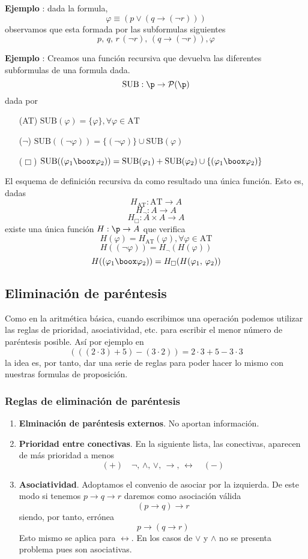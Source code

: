 \addtocounter{ej}{1} %
\textbf{Ejemplo }: dada la formula, 
\[ \varphi \equiv (p \lor (q \rightarrow (\neg r))) \]
observamos que esta formada por las subformulas siguientes
\[ p, \, q, \, r \, (\neg r), \, (q \rightarrow (\neg r)), \varphi \]
\addtocounter{ej}{1} %
\textbf{Ejemplo }: Creamos una función recursiva que devuelva las diferentes subformulas de una formula dada.
\[ \mbox{SUB}: \p \rightarrow \mathcal{P}(\p) \]
dada por 
\begin{itemize}
	\item[(AT)] $\mbox{SUB}(\varphi)=\{\varphi \}, \forall \varphi \in \mbox{AT}$
	\item[($\neg$)] $\mbox{SUB}((\neg \varphi))=\{ (\neg\varphi)\} \cup \mbox{SUB}(\varphi)$
	\item[($\Box$)] $ \mbox{SUB} ((\varphi_1 \boox \varphi_2) )= \mbox{SUB}(\varphi_1)+\mbox{SUB}(\varphi_2) \cup \{ (\varphi_1 \boox \varphi_2) \}$
\end{itemize}
\begin{prop} El esquema de definición recursiva da como resultado una única función. Esto es, dadas 
\[ H_{\mbox{AT}}: \mbox{AT} \rightarrow A \]
\[ H_{\lnot}: A \rightarrow A \]
\[ H_{\Box}: A \times A \rightarrow A \]
existe una única función $H: \p \rightarrow A$ que verifica 
\[ H(\varphi)=H_{\mbox{AT}}(\varphi), \forall \varphi \in \mbox{AT} \]
\[H((\neg \varphi))=H_{\neg}(H (\varphi))\]
\[H ( (\varphi_1 \boox \varphi_2) ) = H_{\Box}(H(\varphi_1, \, \varphi_2))\]
\end{prop}
\subsection*{Eliminación de paréntesis}
Como en la aritmética básica, cuando escribimos una operación podemos utilizar las reglas de prioridad, asociatividad, etc. para escribir el menor número de paréntesis posible. Así por ejemplo en 
\[ (((2 \cdot 3)+5)-(3 \cdot 2))=2 \cdot 3 +5-3\cdot 3 \]
la idea es, por tanto, dar una serie de reglas para poder hacer lo mismo con nuestras formulas de proposición. 
\subsubsection*{Reglas de eliminación de paréntesis}
\begin{enumerate}
	\item \textbf{Elminación de paréntesis externos}. No aportan información.
	\item \textbf{Prioridad entre conectivas}. En la siguiente lista, las conectivas, aparecen de más prioridad a menos
	\[ (+)\quad \neg, \, \wedge, \, \lor, \, \rightarrow, \, \leftrightarrow \quad (-) \]
	\item \textbf{Asociatividad}. Adoptamos el convenio de asociar por la izquierda. De este modo si tenemos $p \rightarrow q \rightarrow r$ daremos como asociación válida 
	\[ (p \rightarrow q) \rightarrow r \]
	siendo, por tanto, errónea 
	\[ p \rightarrow (q \rightarrow r)  \]
	Esto mismo se aplica para $\leftrightarrow$. En los casos de $\vee$ y $\wedge$ no se presenta problema pues son asociativas.
\end{enumerate}
